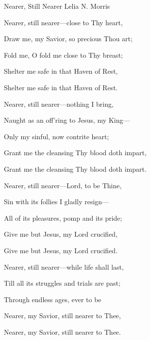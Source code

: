 \documentclass[12pt]{book}
\begin{document}
\begin{song}{Nearer, Still Nearer}{}
  {\SBPubDom}
  {Lelia N. Morris}
  {}
  {}

  \begin{SBVerse}
    Nearer, still nearer---close to Thy heart,

    Draw me, my Savior, so precious Thou art;

    Fold me, O fold me close to Thy breast;

    Shelter me safe in that Haven of Rest,

    Shelter me safe in that Haven of Rest.
  \end{SBVerse}

  \begin{SBVerse}
    Nearer, still nearer---nothing I bring,

    Naught as an off'ring to Jesus, my King---

    Only my sinful, now contrite heart;

    Grant me the cleansing Thy blood doth impart,

    Grant me the cleansing Thy blood doth impart.
  \end{SBVerse}

  \begin{SBVerse}
    Nearer, still nearer---Lord, to be Thine,

    Sin with its follies I gladly resign---

    All of its pleasures, pomp and its pride;

    Give me but Jesus, my Lord crucified,

    Give me but Jesus, my Lord crucified.
  \end{SBVerse}

  \begin{SBVerse}
    Nearer, still nearer---while life shall last,

    Till all its struggles and trials are past;

    Through endless ages, ever to be

    Nearer, my Savior, still nearer to Thee,

    Nearer, my Savior, still nearer to Thee.
  \end{SBVerse}
\end{song}
\end{document}
